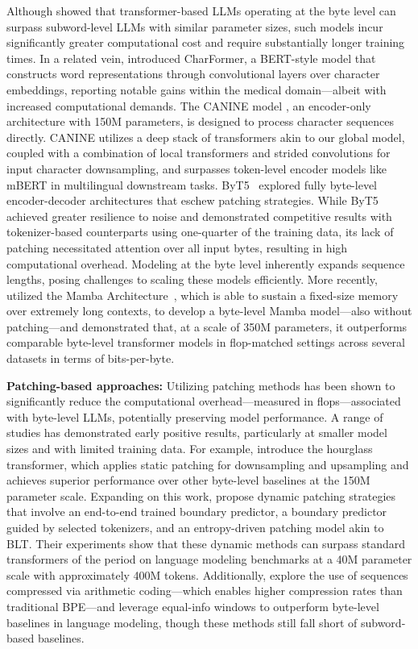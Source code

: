 Although \cite{Choe2019BridgingTG} showed that transformer-based LLMs operating at the byte level can surpass subword-level LLMs with similar parameter sizes, such models incur significantly greater computational cost and require substantially longer training times. In a related vein, \cite{el2020characterbert} introduced CharFormer, a BERT-style model that constructs word representations through convolutional layers over character embeddings, reporting notable gains within the medical domain—albeit with increased computational demands. The CANINE model \cite{clark2022canine}, an encoder-only architecture with 150M parameters, is designed to process character sequences directly. CANINE utilizes a deep stack of transformers akin to our global model, coupled with a combination of local transformers and strided convolutions for input character downsampling, and surpasses token-level encoder models like mBERT in multilingual downstream tasks. ByT5~\citep{xue2022byt5} explored fully byte-level encoder-decoder architectures that eschew patching strategies. While ByT5 achieved greater resilience to noise and demonstrated competitive results with tokenizer-based counterparts using one-quarter of the training data, its lack of patching necessitated attention over all input bytes, resulting in high computational overhead. Modeling at the byte level inherently expands sequence lengths, posing challenges to scaling these models efficiently. More recently, \cite{wang2024mambabyte} utilized the Mamba Architecture~\citep{gu2023mamba}, which is able to sustain a fixed-size memory over extremely long contexts, to develop a byte-level Mamba model—also without patching—and demonstrated that, at a scale of 350M parameters, it outperforms comparable byte-level transformer models in flop-matched settings across several datasets in terms of bits-per-byte.

\textbf{Patching-based approaches:} Utilizing patching methods has been shown to significantly reduce the computational overhead—measured in flops—associated with byte-level LLMs, potentially preserving model performance. A range of studies has demonstrated early positive results, particularly at smaller model sizes and with limited training data. For example, \cite{nawrot-etal-2022-hierarchical} introduce the hourglass transformer, which applies static patching for downsampling and upsampling and achieves superior performance over other byte-level baselines at the 150M parameter scale. Expanding on this work, \cite{nawrot-etal-2023-efficient} propose dynamic patching strategies that involve an end-to-end trained boundary predictor, a boundary predictor guided by selected tokenizers, and an entropy-driven patching model akin to {\textsc BLT}. Their experiments show that these dynamic methods can surpass standard transformers of the period on language modeling benchmarks at a 40M parameter scale with approximately 400M tokens. Additionally, \cite{lester2024training} explore the use of sequences compressed via arithmetic coding—which enables higher compression rates than traditional BPE—and leverage equal-info windows to outperform byte-level baselines in language modeling, though these methods still fall short of subword-based baselines.

